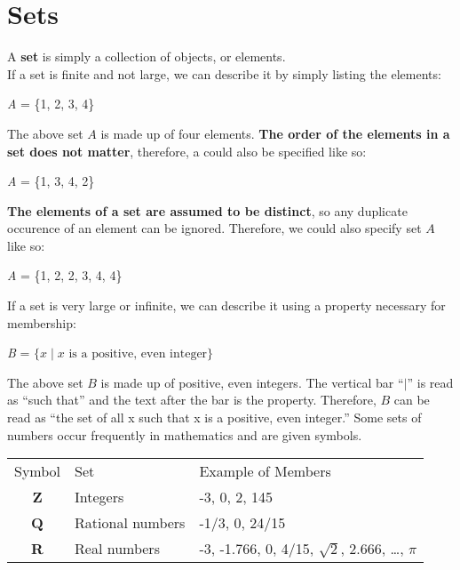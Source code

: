 \section*{Sets}

A \textbf{set} is simply a collection of objects, or elements.\\
If a set is finite and not large, we can describe it by simply listing the elements:

\begin{center}
\textit{A} = \{1, 2, 3, 4\}
\end{center}


The above set $A$ is made up of four elements.  \textbf{The order of the elements in a set does not matter}, therefore, a could also be specified like so:

\begin{center}
\textit{A} = \{1, 3, 4, 2\}
\end{center}

\textbf{The elements of a set are assumed to be distinct}, so any duplicate occurence of an element can be ignored.  Therefore, we could also specify set $A$ like so:

\begin{center}
\textit{A} = \{1, 2, 2, 3, 4, 4\}
\end{center}


If a set is very large or infinite, we can describe it using a property necessary for membership:

\begin{center}
\textit{B} = $\{x \mid x \text{ is a positive, even integer}\}$
\end{center}

The above set $B$ is made up of positive, even integers.  The vertical bar ``$\mid$'' is read as ``such that'' and the text after the bar is the property.  Therefore, $B$ can be read as ``the set of all x such that x is a positive, even integer.''
Some sets of numbers occur frequently in mathematics and are given symbols.

\begin{table}[]
\begin{tabular}{cll}
\multicolumn{1}{l}{Symbol} & Set              & Example of Members         \\
\textbf{Z}                 & Integers         & -3, 0, 2, 145              \\
\textbf{Q}                 & Rational numbers & -1/3, 0, 24/15             \\
\textbf{R}                 & Real numbers     & -3, -1.766, 0, 4/15, $\sqrt{2}$, 2.666, \dots, $\pi$
\end{tabular}
\end{table}

